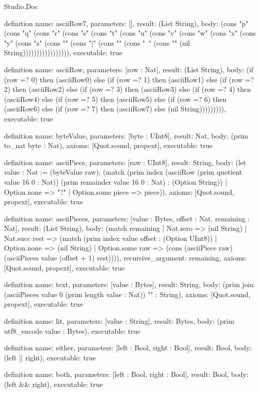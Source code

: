 \begin{lexlean}{Studio.Doc}
\begin{semanticmodule}
definition{
  name: asciiRow7,
  parameters: [],
  result: (List String),
  body: (cons "p" (cons "q" (cons "r" (cons "s" (cons "t" (cons "u" (cons "v" (cons "w" (cons "x" (cons "y" (cons "z" (cons "{" (cons "|" (cons "}" (cons "~" (cons "" (nil String))))))))))))))))),
  executable: true
}

definition{
  name: asciiRow,
  parameters: [row : Nat],
  result: (List String),
  body: (if (row =? 0) then (asciiRow0) else (if (row =? 1) then (asciiRow1) else (if (row =? 2) then (asciiRow2) else (if (row =? 3) then (asciiRow3) else (if (row =? 4) then (asciiRow4) else (if (row =? 5) then (asciiRow5) else (if (row =? 6) then (asciiRow6) else (if (row =? 7) then (asciiRow7) else (nil String))))))))),
  executable: true
}

definition{
  name: byteValue,
  parameters: [byte : UInt8],
  result: Nat,
  body: (prim to_nat byte : Nat),
  axioms: [Quot.sound, propext],
  executable: true
}

definition{
  name: asciiPiece,
  parameters: [raw : UInt8],
  result: String,
  body: (let value : Nat := (byteValue raw); (match (prim index (asciiRow (prim quotient value 16 0 : Nat)) (prim remainder value 16 0 : Nat) : (Option String))
    | Option.none => "?"
    | Option.some piece => piece)),
  axioms: [Quot.sound, propext],
  executable: true
}

definition{
  name: asciiPieces,
  parameters: [value : Bytes, offset : Nat, remaining : Nat],
  result: (List String),
  body: (match remaining
    | Nat.zero => (nil String)
    | Nat.succ rest => (match (prim index value offset : (Option UInt8))
      | Option.none => (nil String)
      | Option.some raw => (cons (asciiPiece raw) (asciiPieces value (offset + 1) rest)))),
  recursive_argument: remaining,
  axioms: [Quot.sound, propext],
  executable: true
}

definition{
  name: text,
  parameters: [value : Bytes],
  result: String,
  body: (prim join (asciiPieces value 0 (prim length value : Nat)) "" : String),
  axioms: [Quot.sound, propext],
  executable: true
}

definition{
  name: lit,
  parameters: [value : String],
  result: Bytes,
  body: (prim utf8_encode value : Bytes),
  executable: true
}

definition{
  name: either,
  parameters: [left : Bool, right : Bool],
  result: Bool,
  body: (left || right),
  executable: true
}

definition{
  name: both,
  parameters: [left : Bool, right : Bool],
  result: Bool,
  body: (left && right),
  executable: true
}


\end{semanticmodule}
\end{lexlean}
